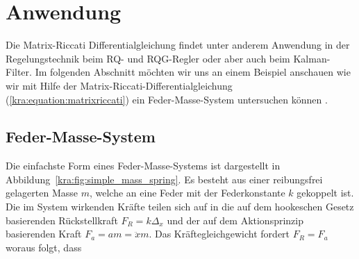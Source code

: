 \section{Anwendung \label{kra:section:anwendung}}
\newcommand{\dt}[0]{\frac{d}{dt}}

Die Matrix-Riccati Differentialgleichung findet unter anderem Anwendung in der Regelungstechnik beim RQ- und RQG-Regler oder aber auch beim Kalman-Filter.
Im folgenden Abschnitt möchten wir uns an einem Beispiel anschauen wie wir mit Hilfe der Matrix-Riccati-Differentialgleichung (\ref{kra:equation:matrixriccati}) ein Feder-Masse-System untersuchen können \cite{kra:riccati}.

\subsection{Feder-Masse-System}
\label{kra:subsection:feder-masse-system}
Die einfachste Form eines Feder-Masse-Systems ist dargestellt in Abbildung~\ref{kra:fig:simple_mass_spring}.
Es besteht aus einer reibungsfrei gelagerten Masse $m$, welche an eine Feder mit der Federkonstante $k$ gekoppelt ist.
Die im System wirkenden Kräfte teilen sich auf in die auf dem hookeschen Gesetz basierenden Rückstellkraft $F_R = k \Delta_x$ und der auf dem Aktionsprinzip basierenden Kraft $F_a = am = \ddot{x} m$.
Das Kräftegleichgewicht fordert $F_R = F_a$ woraus folgt, dass

